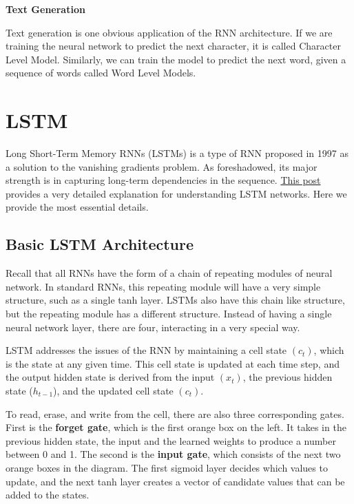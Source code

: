 \documentclass[
]{book}
\begin{document}
\textbf{Text Generation}

Text generation is one obvious application of the RNN architecture. If we are training the neural network to predict the next character, it is called Character Level Model. Similarly, we can train the model to predict the next word, given a sequence of words called Word Level Models.

\hypertarget{lstm}{%
\section{LSTM}\label{lstm}}

Long Short-Term Memory RNNs (LSTMs) is a type of RNN proposed in 1997 as a solution to the vanishing gradients problem. As foreshadowed, its major strength is in capturing long-term dependencies in the sequence. \href{https://colah.github.io/posts/2015-08-Understanding-LSTMs/}{This post} provides a very detailed explanation for understanding LSTM networks. Here we provide the most essential details.

\hypertarget{basic-lstm-architecture}{%
\subsection{Basic LSTM Architecture}\label{basic-lstm-architecture}}

Recall that all RNNs have the form of a chain of repeating modules of neural network. In standard RNNs, this repeating module will have a very simple structure, such as a single tanh layer. LSTMs also have this chain like structure, but the repeating module has a different structure. Instead of having a single neural network layer, there are four, interacting in a very special way.

LSTM addresses the issues of the RNN by maintaining a cell state \((c_t)\), which is the state at any given time. This cell state is updated at each time step, and the output hidden state is derived from the input \((x_t)\), the previous hidden state (\(h_{t-1}\)), and the updated cell state \((c_t)\).

To read, erase, and write from the cell, there are also three corresponding gates. First is the \textbf{forget gate}, which is the first orange box on the left. It takes in the previous hidden state, the input and the learned weights to produce a number between 0 and 1. The second is the \textbf{input gate}, which consists of the next two orange boxes in the diagram. The first sigmoid layer decides which values to update, and the next tanh layer creates a vector of candidate values that can be added to the states.
\end{document}
